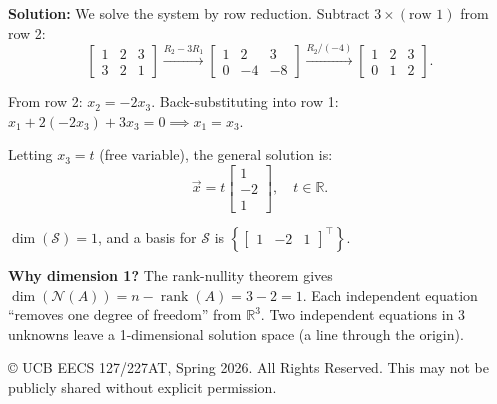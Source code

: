\documentclass[10pt]{article}
\theoremstyle{definition}
\theoremstyle{plain}
\newcommand{\RR}{\mathbb{R}}
\newcommand{\NN}{\mathcal{N}}
\DeclareMathOperator{\rank}{rank}
\begin{document}
\begin{enumerate}[label=(\alph*)]
    \textbf{Solution:} We solve the system by row reduction. Subtract $3 \times (\text{row 1})$ from row 2:
    \begin{equation}
        \begin{bmatrix} 1 & 2 & 3 \\ 3 & 2 & 1 \end{bmatrix} \xrightarrow{R_2 - 3R_1}
        \begin{bmatrix} 1 & 2 & 3 \\ 0 & -4 & -8 \end{bmatrix} \xrightarrow{R_2 / (-4)}
        \begin{bmatrix} 1 & 2 & 3 \\ 0 & 1 & 2 \end{bmatrix}.
    \end{equation}

    From row 2: $x_2 = -2x_3$. Back-substituting into row 1: $x_1 + 2(-2x_3) + 3x_3 = 0 \implies x_1 = x_3$.

    Letting $x_3 = t$ (free variable), the general solution is:
    \begin{equation}
        \vec{x} = t \begin{bmatrix} 1 \\ -2 \\ 1 \end{bmatrix}, \quad t \in \RR.
    \end{equation}

    \begin{result}
    $\dim(\mathcal{S}) = 1$, and a basis for $\mathcal{S}$ is $\left\{\begin{bmatrix} 1 & -2 & 1 \end{bmatrix}^\top\right\}$.
    \end{result}

    \begin{intuition}
    \textbf{Why dimension 1?} The rank-nullity theorem gives $\dim(\NN(A)) = n - \rank(A) = 3 - 2 = 1$. Each independent equation ``removes one degree of freedom'' from $\RR^3$. Two independent equations in 3 unknowns leave a 1-dimensional solution space (a line through the origin).
    \end{intuition}
\end{enumerate}

\vfill
\noindent\footnotesize{\copyright{} UCB EECS 127/227AT, Spring 2026. \scriptsize{All Rights Reserved. This may not be publicly shared without explicit permission.}}

\newpage
\end{document}
